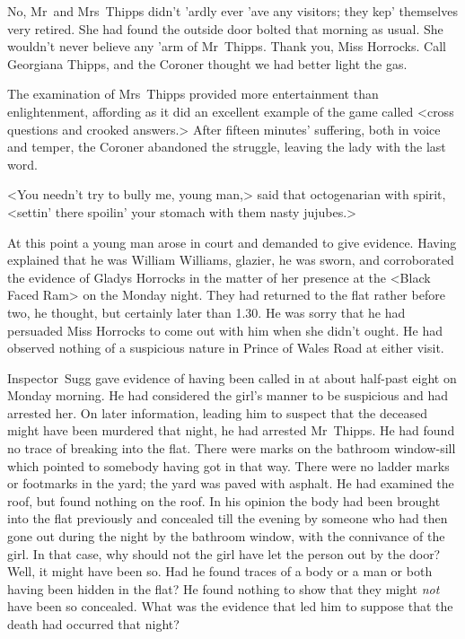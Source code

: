 No, Mr~and Mrs~Thipps didn't 'ardly ever 'ave any visitors; they kep' themselves very retired. She had found the outside door bolted that morning as usual. She wouldn't never believe any 'arm of Mr~Thipps. Thank you, Miss Horrocks. Call Georgiana Thipps, and the Coroner thought we had better light the gas.

The examination of Mrs~Thipps provided more entertainment than enlightenment, affording as it did an excellent example of the game called <cross questions and crooked answers.> After fifteen minutes' suffering, both in voice and temper, the Coroner abandoned the struggle, leaving the lady with the last word.

<You needn't try to bully me, young man,> said that octogenarian with spirit, <settin' there spoilin' your stomach with them nasty jujubes.>

At this point a young man arose in court and demanded to give evidence. Having explained that he was William Williams, glazier, he was sworn, and corroborated the evidence of Gladys Horrocks in the matter of her presence at the <Black Faced Ram> on the Monday night. They had returned to the flat rather before two, he thought, but certainly later than 1.30. He was sorry that he had persuaded Miss Horrocks to come out with him when she didn't ought. He had observed nothing of a suspicious nature in Prince of Wales Road at either visit.

Inspector~Sugg gave evidence of having been called in at about half-past eight on Monday morning. He had considered the girl's manner to be suspicious and had arrested her. On later information, leading him to suspect that the deceased might have been murdered that night, he had arrested Mr~Thipps. He had found no trace of breaking into the flat. There were marks on the bathroom window-sill which pointed to somebody having got in that way. There were no ladder marks or footmarks in the yard; the yard was paved with asphalt. He had examined the roof, but found nothing on the roof. In his opinion the body had been brought into the flat previously and concealed till the evening by someone who had then gone out during the night by the bathroom window, with the connivance of the girl. In that case, why should not the girl have let the person out by the door? Well, it might have been so. Had he found traces of a body or a man or both having been hidden in the flat? He found nothing to show that they might \textit{not} have been so concealed. What was the evidence that led him to suppose that the death had occurred that night?

